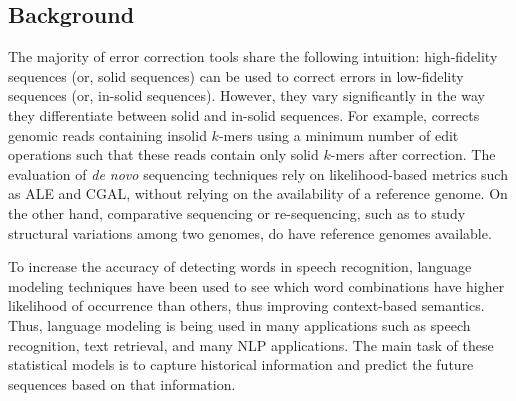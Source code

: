 \vspace{-5pt}
\subsection{Background}


The majority of error correction tools share the following intuition: high-fidelity sequences (or, solid sequences) can be used to correct errors in low-fidelity sequences (or, in-solid sequences). However, they vary significantly in the way they differentiate between solid and in-solid sequences. For example, \cite{yang2010reptile} corrects genomic reads containing insolid $k$-mers using a minimum number of edit operations such that these reads contain only solid $k$-mers after correction.
The evaluation of \textit{de novo} sequencing techniques rely on likelihood-based metrics such as ALE and CGAL, without relying on the availability of a reference genome. On the other hand, comparative sequencing or re-sequencing, such as to study structural variations among two genomes, do have reference genomes available. 


To increase the accuracy of detecting words in speech recognition, language modeling techniques have been used to see which word combinations have higher likelihood of occurrence than others, thus improving context-based semantics. Thus, language modeling is being used in many applications such as speech recognition, text retrieval, and many NLP applications. The main task of these statistical models is to capture historical information and predict the future sequences based on that information.

